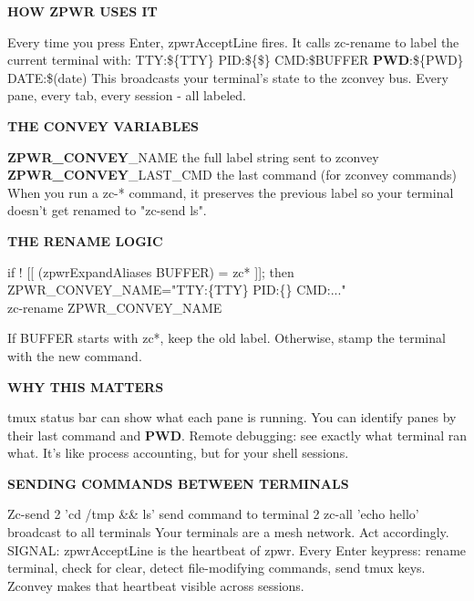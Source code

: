 \documentclass[11pt,a4paper,twoside]{book}
\begin{document}
\vspace{12pt}
{\bfseries\color{neonyellow} HOW \textbf{ZPWR} USES IT}\vspace{4pt}

Every time you press Enter, zpwrAcceptLine fires. It calls zc-rename to label the current terminal with: TTY:\$\{TTY\} PID:\$\{\$\} CMD:\$BUFFER \textbf{PWD}:\$\{PWD\} DATE:\$(date) This broadcasts your terminal's state to the zconvey bus. Every pane, every tab, every session - all labeled.


\vspace{12pt}
{\bfseries\color{neonyellow} THE CONVEY VARIABLES}\vspace{4pt}

\textbf{ZPWR\_CONVEY}\_NAME      the full label string sent to zconvey \textbf{ZPWR\_CONVEY}\_LAST\_CMD  the last command (for zconvey commands) When you run a zc-* command, it preserves the previous label so your terminal doesn't get renamed to "zc-send ls".


\vspace{12pt}
{\bfseries\color{neonyellow} THE RENAME LOGIC}\vspace{4pt}

\begin{codebox}
\color{neongreen}if ! [[ (zpwrExpandAliases BUFFER) = zc* ]]; then\\
\color{neongreen}ZPWR\_CONVEY\_NAME="TTY:\{TTY\} PID:\{\} CMD:..."\\
\color{neongreen}zc-rename ZPWR\_CONVEY\_NAME\\
\end{codebox}

If BUFFER starts with zc*, keep the old label. Otherwise, stamp the terminal with the new command.


\vspace{12pt}
{\bfseries\color{neonyellow} WHY THIS MATTERS}\vspace{4pt}

tmux status bar can show what each pane is running. You can identify panes by their last command and \textbf{PWD}. Remote debugging: see exactly what terminal ran what. It's like process accounting, but for your shell sessions.


\vspace{12pt}
{\bfseries\color{neonyellow} SENDING COMMANDS BETWEEN TERMINALS}\vspace{4pt}

Zc-send 2 'cd /tmp \&\& ls'  send command to terminal 2 zc-all 'echo hello'        broadcast to all terminals Your terminals are a mesh network. Act accordingly. SIGNAL: zpwrAcceptLine is the heartbeat of zpwr. Every Enter keypress: rename terminal, check for clear, detect file-modifying commands, send tmux keys. Zconvey makes that heartbeat visible across sessions.
\end{document}
